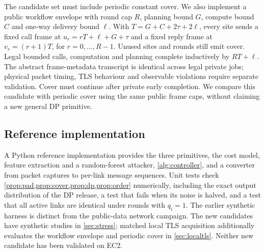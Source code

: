 The candidate set must include periodic constant cover. We also implement a public workflow envelope with round cap $R$, planning bound $G$, compute bound $C$ and one-way delivery bound $\ell$. With $T=G+C+2\tau+2\ell$, every site sends a fixed call frame at $u_r=rT+\ell+G+\tau$ and a fixed reply frame at $v_r=(r+1)T$, for $r=0,\ldots,R-1$. Unused sites and rounds still emit cover. Legal bounded calls, computation and planning complete inductively by $RT+\ell$. The abstract frame-metadata transcript is identical across legal private jobs; physical packet timing, TLS behaviour and observable violations require separate validation. Cover must continue after private early completion. We compare this candidate with periodic cover using the same public frame caps, without claiming a new general DP primitive.

\subsection{Reference implementation}
A Python reference implementation provides the three primitives, the cost model, feature extraction and a random-forest attacker, \cref{alg:controller}, and a converter from packet captures to per-link message sequences. Unit tests check \cref{prop:pad,prop:cover,prop:dp,prop:order} numerically, including the exact output distribution of the DP release, a test that fails when its noise is halved, and a test that all active links are identical under rounds with $q_i=1$. The earlier synthetic harness is distinct from the public-data network campaign. The new candidates have synthetic studies in \cref{sec:stress}; matched local TLS acquisition additionally evaluates the workflow envelope and periodic cover in \cref{sec:localtls}. Neither new candidate has been validated on EC2.

